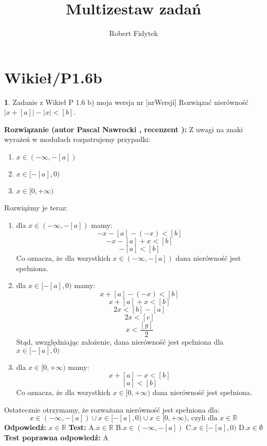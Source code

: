 \documentclass[12pt, a4paper]{article}
\title{Multizestaw zadań}
\author{Robert Fidytek}
\date{}
\theoremstyle{definition} %
\newtheorem{zad}{}
\newcommand{\kategoria}[1]{\section{#1}} %
\newcommand{\zadStart}[1]{\begin{zad}#1\newline} %
\newcommand{\zadStop}{\end{zad}}   %
\newcommand{\rozwStart}[2]{\noindent \textbf{Rozwiązanie (autor #1 , recenzent #2): }\newline} %
\newcommand{\rozwStop}{\newline}                                            %
\newcommand{\odpStart}{\noindent \textbf{Odpowiedź:}\newline}    %
\newcommand{\odpStop}{\newline}                                             %
\newcommand{\testStart}{\noindent \textbf{Test:}\newline} %
\newcommand{\testStop}{\newline} %
\newcommand{\kluczStart}{\noindent \textbf{Test poprawna odpowiedź:}\newline} %
\newcommand{\kluczStop}{\newline} %
\begin{document}
\maketitle


\kategoria{Wikieł/P1.6b}
\zadStart{Zadanie z Wikieł P 1.6 b) moja wersja nr [nrWersji]}
Rozwiązać nierówność $|x+[a]|-|x|<[b]$.
\zadStop
\rozwStart{Pascal Nawrocki}{}
Z uwagi na znaki wyrażeń w modułach rozpatrujemy przypadki:
\begin{enumerate}
\item$x\in(-\infty,-[a])$
\item$x\in[-[a],0)$
\item$x\in[0,+\infty)$
\end{enumerate}
Rozwiążmy je teraz:
\begin{enumerate}
\item dla $x\in(-\infty,-[a])$
 mamy: 
$$ -x-[a]-(-x)<[b]$$
$$ -x-[a]+x<[b]$$
$$ -[a]<[b]$$
Co oznacza, że dla wszystkich $x\in(-\infty,-[a])$ dana nierówność jest spełniona.
\item dla $x\in[-[a],0)$
mamy:
$$x+[a]-(-x)<[b]$$
$$x+[a]+x<[b]$$
$$2x<[b]-[a]$$
$$2x<[c]$$
$$x<\frac{[g]}{2}$$
Stąd, uwzględniając założenie, dana nierówność jest spełniona dla $x\in[-[a],0)$
\item dla $x\in[0,+\infty)$
mamy:
$$x+[a]-x<[b]$$
$$[a]<[b]$$
Co oznacza, że dla wszystkich $x\in[0,+\infty)$ dana nierówność jest spełniona.
\end{enumerate}
Ostatecznie otrzymamy, że rozważana nierówność jest spełniona dla: 
$$x\in(-\infty,-[a])\cup x\in[-[a],0)\cup x\in[0,+\infty)  \text{, czyli dla } x\in \mathbb{R}$$
\rozwStop
\odpStart
$ x\in \mathbb{R}$
\odpStop
\testStart
A.$x\in \mathbb{R}$
B.$x\in(-\infty,-[a])$
C.$x\in[-[a],0)$
D.$x\in \emptyset$
\testStop
\kluczStart
A
\kluczStop
\end{document}
